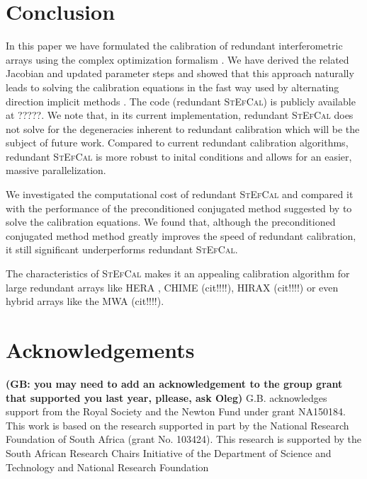 \documentclass[useAMS,usenatbib]{mn2e}
\begin{document}
\section{Conclusion}
\label{sec:conclusions}
In this paper we have formulated the calibration of redundant interferometric arrays using the complex optimization formalism \citep{Smirnov2015}. We have derived the related Jacobian and updated parameter steps and showed that this approach naturally leads to solving the calibration equations in the fast way used by alternating direction implicit methods \citep[][]{Salvini2014,Marthi2014}. The code (redundant \textsc{StEfCal}) is publicly available at ?????. We note that, in its current implementation, redundant \textsc{StEfCal} does not solve for the degeneracies inherent to redundant calibration  \citep{Zheng2014,Kurien2016} which will be the subject of future work. Compared to current redundant calibration algorithms, redundant \textsc{StEfCal} is more robust to inital conditions and allows for an easier, massive parallelization. 

We investigated the computational cost of redundant \textsc{StEfCal} and compared it with the performance of the preconditioned conjugated method suggested by \cite{Liu2010} to solve the calibration equations. We found that, although the preconditioned conjugated method method greatly improves the speed of redundant calibration, it still significant underperforms redundant \textsc{StEfCal}.

The characteristics of \textsc{StEfCal} makes it an appealing calibration algorithm for large redundant arrays like HERA \citep{deboer2017}, CHIME (cit!!!!), HIRAX (cit!!!!) or even hybrid arrays like the MWA (cit!!!!).

\section*{Acknowledgements}
{\bf (GB: you may need to add an acknowledgement to the group grant that supported you last year, pllease, ask Oleg)} G.B. acknowledges support from the Royal Society and the Newton Fund under grant NA150184. This work is based on the research supported in part by the National Research Foundation of South Africa (grant No. 103424). This research is supported by the South African Research Chairs Initiative of the Department of Science and Technology and National Research Foundation





\end{document}
